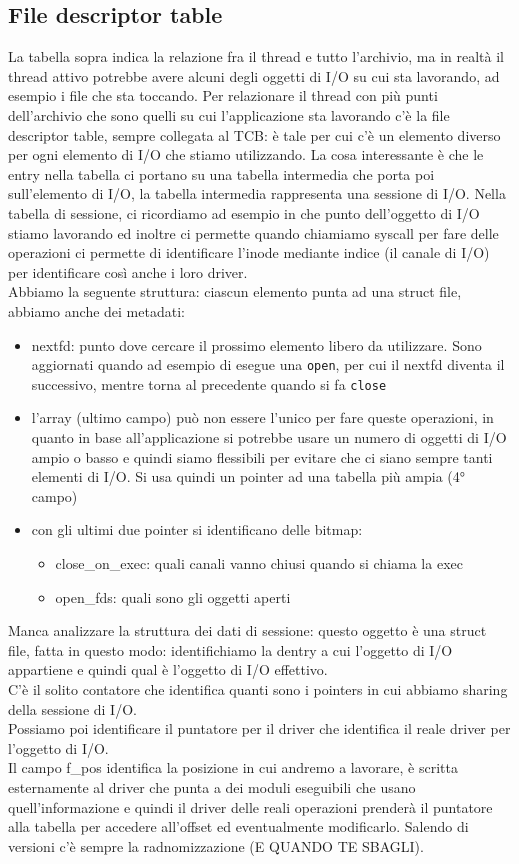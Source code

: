 \documentclass[12pt, oneside]{extbook}
\begin{document}
\subsection{File descriptor table}
La tabella sopra indica la relazione fra il thread e tutto l'archivio, ma in realtà il  thread attivo potrebbe avere alcuni degli oggetti di I/O su cui sta lavorando, ad esempio i file che sta toccando. Per relazionare il thread con più punti dell'archivio che sono quelli su cui l'applicazione sta lavorando c'è  la file descriptor table, sempre collegata al TCB: è tale per cui c'è un elemento diverso per ogni elemento di I/O che stiamo utilizzando. La cosa interessante è che le entry nella tabella ci portano su una tabella intermedia che porta poi sull'elemento di I/O, la tabella intermedia rappresenta una sessione di I/O. Nella tabella di sessione, ci ricordiamo ad esempio in che punto dell'oggetto di I/O stiamo lavorando ed inoltre ci permette quando chiamiamo syscall per fare delle operazioni ci permette di identificare l'inode mediante indice (il canale di I/O) per identificare così anche i loro driver.\\Abbiamo la seguente struttura:
ciascun elemento punta ad una struct file, abbiamo anche dei metadati:
\begin{itemize}
\item nextfd: punto dove cercare il prossimo elemento libero da utilizzare. Sono aggiornati quando ad esempio di esegue una \texttt{open}, per cui il nextfd diventa il successivo, mentre torna al precedente quando si fa \texttt{close}
\item l'array (ultimo campo) può non essere l'unico per fare queste operazioni, in quanto in base all'applicazione si potrebbe usare un numero di oggetti di I/O ampio o basso e quindi siamo flessibili per evitare che ci siano sempre tanti elementi di I/O. Si usa quindi un pointer ad una tabella più ampia (4° campo)
\item con gli ultimi due pointer si identificano delle bitmap:
\begin{itemize}
\item close\_on\_exec: quali canali vanno chiusi quando si chiama la exec
\item open\_fds: quali sono gli oggetti aperti
\end{itemize}
\end{itemize}
Manca analizzare la struttura dei dati di sessione: questo oggetto è una struct file, fatta in questo modo:
identifichiamo la dentry a cui l'oggetto di I/O appartiene e quindi qual è l'oggetto di I/O effettivo.\\C'è il solito contatore che identifica quanti sono i pointers in cui abbiamo sharing della sessione di I/O.\\Possiamo poi identificare il puntatore per il driver che identifica il reale driver per l'oggetto di I/O.\\Il campo f\_pos identifica la posizione in cui andremo a lavorare, è scritta esternamente al driver che punta a dei moduli eseguibili che usano quell'informazione e quindi il driver delle reali operazioni prenderà il puntatore alla tabella per accedere all'offset ed eventualmente modificarlo. Salendo di versioni c'è sempre la radnomizzazione (E QUANDO TE SBAGLI).
\end{document}
